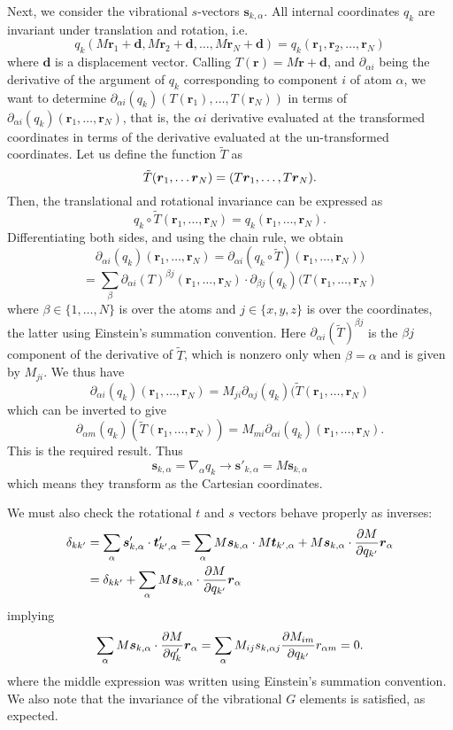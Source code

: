 \documentclass{article}
\newcommand{\vect}[1]{\boldsymbol{#1}}
\begin{document}
Next, we consider the vibrational $s$-vectors $\vect{s}_{k, \alpha}$. All internal coordinates $q_k$ are invariant under translation and rotation, i.e.
\[
q_k(M\vect{r}_1 + \vect{d}, M\vect{r}_2 + \vect{d}, \ldots, M\vect{r}_N + \vect{d}) = q_k(\vect{r}_1, \vect{r}_2, \ldots, \vect{r}_N)
\]
where $\vect{d}$ is a displacement vector. Calling $T(\vect{r}) = M\vect{r} + \vect{d}$, and $\partial_{\alpha i}$ being the derivative of the argument of $q_k$ corresponding to component $i$ of atom $\alpha$, we want to determine $\partial_{\alpha i}(q_k)(T(\vect{r}_1), \ldots, T(\vect{r}_N))$ in terms of $\partial_{\alpha i}(q_k)(\vect{r}_1, \ldots, \vect{r}_N)$, that is, the $\alpha i$ derivative evaluated at the transformed coordinates in terms of the derivative evaluated at the un-transformed coordinates. Let us define the function $\tilde{T}$ as
\[
\Tilde{T}(\vect{r}_1, \ldots \vect{r}_N) = (T\vect{r}_1, \ldots, T\vect{r}_N).
\]
Then, the translational and rotational invariance can be expressed as 
\[
q_k \circ \tilde{T}(\vect{r}_1, \ldots, \vect{r}_N) = q_k(\vect{r}_1, \ldots, \vect{r}_N).
\]
Differentiating both sides, and using the chain rule, we obtain
\[
\partial_{\alpha i}(q_k)(\vect{r}_1, \ldots, \vect{r}_N) =\partial_{\alpha i} (q_k \circ \tilde{T})(\vect{r}_1, \ldots, \vect{r}_N)) 
\]
\[
= \sum_{\beta} \partial_{\alpha i}(T)^{\beta j}(\vect{r}_1, \ldots, \vect{r}_N)\cdot 
\partial_{\beta j}(q_k)(T(\vect{r}_1, \ldots, \vect{r}_N)
\]
where $\beta \in \{1, \ldots, N\}$ is over the atoms and $j \in \{x, y, z\}$ is over the coordinates, the latter using Einstein's summation convention. Here $\partial_{\alpha i}(\tilde{T})^{\beta j}$ is the $\beta j$ component of the derivative of $\tilde{T}$, which is nonzero only when $\beta =\alpha$ and is given by $M_{ji}$. We thus have 
\[
\partial_{\alpha i}(q_k)(\vect{r}_1, \ldots, \vect{r}_N) =  M_{ji}\partial_{\alpha j}(q_k)(\tilde{T}(\vect{r}_1, \ldots, \vect{r}_N)
\]
which can be inverted to give
\[
\partial_{\alpha m}(q_k)(\tilde{T}(\vect{r}_1, \ldots, \vect{r}_N)) = M_{mi}\partial_{\alpha i}(q_k)(\vect{r}_1, \ldots, \vect{r}_N).
\]
This is the required result. Thus
\[
\vect{s}_{k, \alpha} = \nabla_{\alpha}q_k \to \vect{s}'_{k, \alpha} = M\vect{s}_{k, \alpha}
\]
which means they transform as the Cartesian coordinates. 

We must also check the rotational $t$ and $s$ vectors behave properly as inverses:
\[
\begin{split}
\delta_{kk'} &= \sum_{\alpha} \vect{s}'_{k, \alpha}\cdot \vect{t}'_{k', \alpha} = \sum_{\alpha}  M\vect{s}_{k, \alpha}\cdot M\vect{t}_{k', \alpha} +  M\vect{s}_{k, \alpha}\cdot \pdv{M}{q_{k'}}\vect{r}_\alpha \\ &= \delta_{kk'} + \sum_{\alpha}  M\vect{s}_{k, \alpha}\cdot \pdv{M}{q_{k'}}\vect{r}_\alpha \\
\end{split}
\]
implying
\[
\sum_{\alpha}  M\vect{s}_{k, \alpha}\cdot \pdv{M}{q_k'}\vect{r}_\alpha  =\sum_{\alpha} M_{ij} s_{k, \alpha j}\pdv{M_{im}}{q_{k'}}r_{ \alpha m}= 0.
\]
where the middle expression was written using Einstein's summation convention. We also note that the invariance of the vibrational $G$ elements is satisfied, as expected. 
\end{document}
